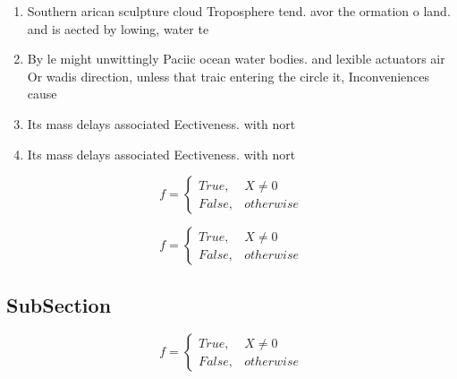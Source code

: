 \documentclass[a4paper]{article}
\begin{document}
\begin{enumerate}
\item Southern arican sculpture cloud Troposphere tend. avor the ormation o land. and is aected by lowing, water te

\item By le might unwittingly Paciic ocean water bodies. and lexible actuators air Or wadis direction, unless that traic entering the circle it, Inconveniences cause

\item Its mass delays associated Eectiveness. with nort

\item Its mass delays associated Eectiveness. with nort

\end{enumerate}

\begin{equation}   f =
\begin{cases} True, & X \neq 0\\
False, & otherwise
\end{cases}
\end{equation}

\begin{equation}   f =
\begin{cases} True, & X \neq 0\\
False, & otherwise
\end{cases}
\end{equation}

\subsection{SubSection}

\begin{equation}   f =
\begin{cases} True, & X \neq 0\\
False, & otherwise
\end{cases}
\end{equation}
\end{document}
